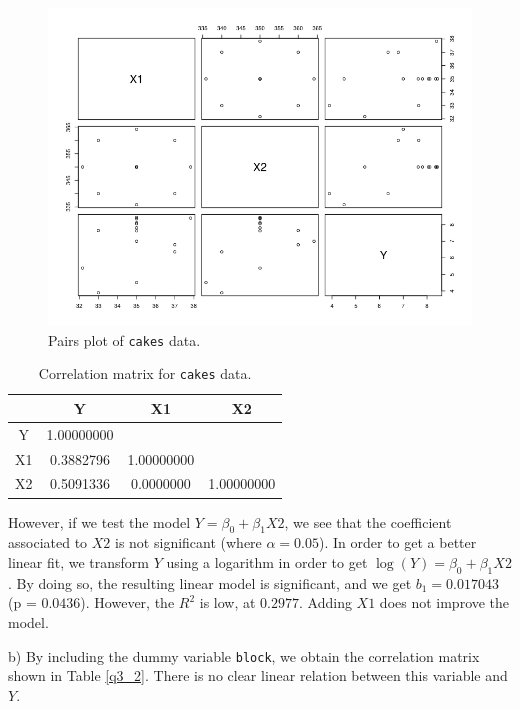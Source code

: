 \documentclass[]{article}
\begin{document}
\begin{figure}[!ht]
\centering
\includegraphics[width=\textwidth]{cakespairs.png}
\caption{Pairs plot of \texttt{cakes} data.}
\label{fig3}
\end{figure}

\begin{table}[!ht]
\centering
\caption{Correlation matrix for \texttt{cakes} data.}
\begin{tabular}{c|c|c|c|}
    &       Y      &       X1     &       X2       \\
\hline
 Y  &  1.00000000  &              &                \\
 X1 &  0.3882796   &  1.00000000  &                \\
 X2 &  0.5091336   &  0.0000000   &   1.00000000   \\
\end{tabular}
\label{q3}
\end{table}

However, if we test the model $Y = \beta_0 + \beta_1 X2$, we see that the coefficient associated to $X2$ is not significant (where $\alpha=0.05$). In order to get a better linear fit, we transform $Y$ using a logarithm in order to get $\log{(Y)} = \beta_0 + \beta_1 X2$. By doing so, the resulting linear model is significant, and we get $b_1 = 0.017043$ (p = $0.0436$). However, the $R^2$ is low, at $0.2977$. Adding $X1$ does not improve the model.

b) By including the dummy variable \texttt{block}, we obtain the correlation matrix shown in Table \ref{q3_2}. There is no clear linear relation between this variable and $Y$.
\end{document}
